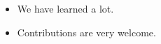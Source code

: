 \begin{itemize}
\item
  We have learned a lot.
\item
  Contributions are very welcome.
\end{itemize}
